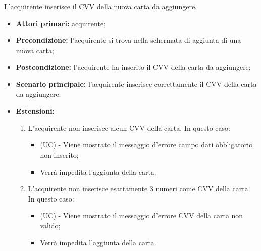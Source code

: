 L'acquirente inserisce il CVV della nuova carta da aggiungere.
\begin{itemize}
    \item \textbf{Attori primari:} acquirente;
    \item \textbf{Precondizione:} l'acquirente si trova nella schermata di aggiunta di una nuova carta;
    \item \textbf{Postcondizione:} l'acquirente ha inserito il CVV della carta da aggiungere;
    \item \textbf{Scenario principale:} l'acquirente inserisce correttamente il CVV della carta da aggiungere.
    \item \textbf{Estensioni:}
    \begin{enumerate}[label=\lett]
        \item L'acquirente non inserisce alcun CVV della carta. In questo caso:
        \begin{itemize}
            \item (UC) - Viene mostrato il messaggio d'errore campo dati obbligatorio non inserito;
            \item Verrà impedita l'aggiunta della carta.
        \end{itemize}
        \item L'acquirente non inserisce esattamente 3 numeri come CVV della carta. In questo caso:
        \begin{itemize}
            \item (UC) - Viene mostrato il messaggio d'errore CVV della carta non valido;
            \item Verrà impedita l'aggiunta della carta.
        \end{itemize}
    \end{enumerate}
\end{itemize}

